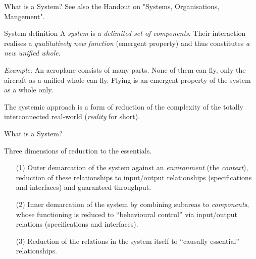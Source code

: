 \documentclass{beamer}
\title{Modelling Sustainable Systems\\ and Semantic Web\\[6pt]
  Systems and their Development
  \vskip1em}
\subtitle{Lecture in the Module 10-202-2312\\ for Master Computer Science}
\author{Prof. Dr. Hans-Gert Gräbe\\
\url{http://www.informatik.uni-leipzig.de/~graebe}}
\date{April 2022}
\begin{document}
{
\begin{frame}
  \titlepage
\end{frame}}

\begin{frame}{What is a System?}
See also the Handout on "Systems, Organisations, Mangement".

\begin{block}{System definition}
  A \emph{system} is a \emph{delimited set of components}.  Their interaction
  realises a \emph{qualitatively new function} (emergent property) and thus
  constitutes \emph{a new unified whole}.
\end{block}

\emph{Example:} An aeroplane consists of many parts. None of them can fly,
only the aircraft as a unified whole can fly. Flying is an emergent property
of the system as a whole only.
  
The systemic approach is a form of reduction of the complexity of the totally
interconnected real-world (\emph{reality} for short).
\end{frame}

\begin{frame}{What is a System?}
  \begin{block}{Three dimensions of reduction to the essentials.}
    \begin{itemize}
    \item[(1)] Outer demarcation of the system against an \emph{environment}
      (the \emph{context}), reduction of these relationships to input/output
      relationships (specifications and interfaces) and guaranteed throughput.
    \item[(2)] Inner demarcation of the system by combining subareas to
      \emph{components}, whose functioning is reduced to “behavioural control”
      via input/output relations (specifications and interfaces).
    \item[(3)] Reduction of the relations in the system itself to “causally
      essential” relationships.
    \end{itemize}
  \end{block}
\end{frame}
\end{document}

